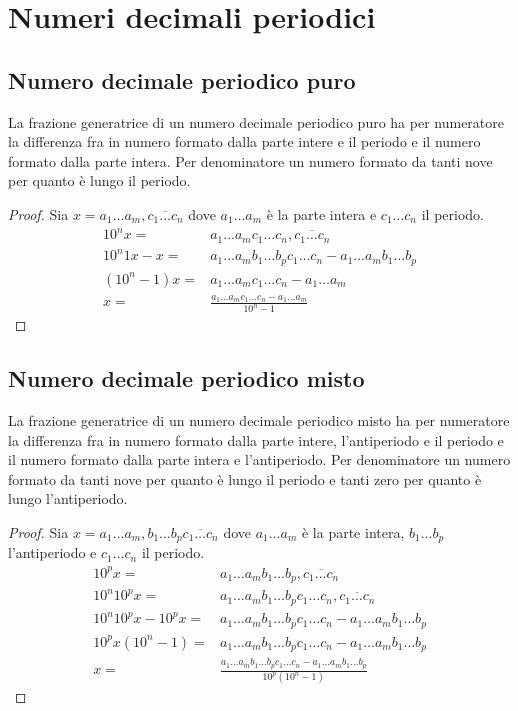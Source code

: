 \chapter{Numeri decimali periodici}
\section{Numero decimale periodico puro}
\begin{thm}
	La frazione generatrice di un numero decimale periodico puro ha per numeratore la differenza fra in numero formato dalla parte intere e il periodo e il numero formato dalla parte intera. Per denominatore un numero formato da tanti nove per quanto è lungo il periodo.  
\end{thm}
\begin{proof}
	Sia $x=a_1\dots a_m,\overline{c_1\dots c_n}$ dove $a_1\dots a_m$ è la parte intera e $c_1\dots c_n$ il periodo. 
	\begin{align*}
	10^nx=&a_1\dots a_m c_1\dots c_n,\overline{c_1\dots c_n}\\
	10^n1x-x=&a_1\dots a_m b_1\dots b_p c_1\dots c_n-a_1\dots a_m b_1\dots b_p\\
	(10^n-1)x=&a_1\dots a_m c_1\dots c_n-a_1\dots a_m\\
	x=&\frac{a_1\dots a_m c_1\dots c_n-a_1\dots a_m}{10^n-1}
	\end{align*}
\end{proof}
\section{Numero decimale periodico misto}
\begin{thm}
La frazione generatrice di un numero decimale periodico misto ha per numeratore la differenza fra in numero formato dalla parte intere, l'antiperiodo e il periodo e il numero formato dalla parte intera e l'antiperiodo. Per denominatore un numero formato da tanti nove per quanto è lungo il periodo e tanti zero per quanto è lungo l'antiperiodo.  
\end{thm}
\begin{proof}
	Sia $x=a_1\dots a_m,b_1\dots b_p \overline{c_1\dots c_n}$ dove $a_1\dots a_m$ è la parte intera, $b_1\dots b_p$ l'antiperiodo e $c_1\dots c_n$ il periodo. 
	\begin{align*}
	10^px=&a_1\dots a_m b_1\dots b_p,\overline{c_1\dots c_n}\\
	10^n10^px=&a_1\dots a_m b_1\dots b_p c_1\dots c_n,\overline{c_1\dots c_n}\\
	10^n10^px-10^px=&a_1\dots a_m b_1\dots b_p c_1\dots c_n-a_1\dots a_m b_1\dots b_p\\
	10^px(10^n-1)=&a_1\dots a_m b_1\dots b_p c_1\dots c_n-a_1\dots a_m b_1\dots b_p\\
	x=&\frac{a_1\dots a_m b_1\dots b_p c_1\dots c_n-a_1\dots a_m b_1\dots b_p}{10^p(10^n-1)}
	\end{align*}
\end{proof}